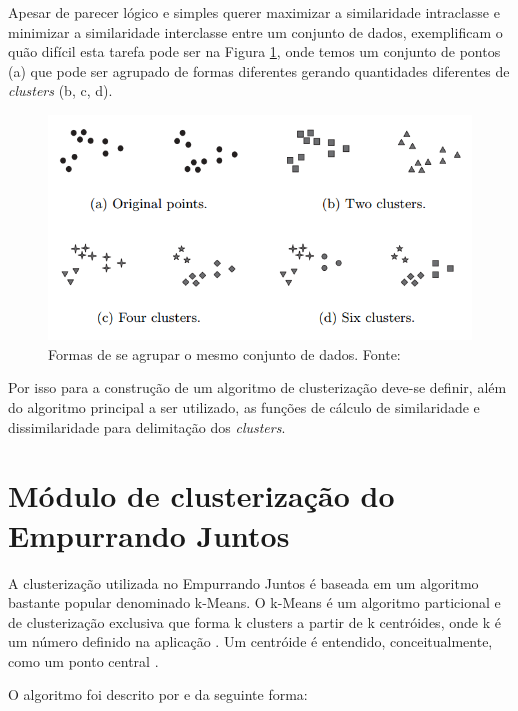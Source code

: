 Apesar de parecer lógico e simples querer maximizar a similaridade intraclasse e minimizar a similaridade interclasse entre um conjunto de dados, 
 exemplificam o quão difícil esta tarefa pode ser na Figura \ref{fig:clusters_difficulty}, onde temos um conjunto
de pontos (a) que pode ser agrupado de formas diferentes gerando quantidades diferentes de \textit{clusters} (b, c, d).

\begin{figure}[ht!]
\centering
\includegraphics[scale=0.4]{figuras/clusters_difficulty.png}
\caption{Formas de se agrupar o mesmo conjunto de dados. Fonte: \cite{tan2013data}}
\label{fig:clusters_difficulty}
\end{figure}

Por isso para a construção de um algoritmo de clusterização deve-se definir, além do algoritmo principal a ser utilizado, as funções
de cálculo de similaridade e dissimilaridade para delimitação dos \textit{clusters}.

\vfill
\pagebreak

\section{Módulo de clusterização do Empurrando Juntos}

A clusterização utilizada no Empurrando Juntos é baseada em um algoritmo bastante popular denominado k-Means. O k-Means é um
algoritmo particional e de clusterização exclusiva que forma k clusters a partir de k centróides, onde k é um número definido na aplicação 
\cite{clustering_review, tan2013data}. Um centróide é entendido, conceitualmente, como um ponto central \cite{han2011data}.

O algoritmo foi descrito por  e  da seguinte forma:


